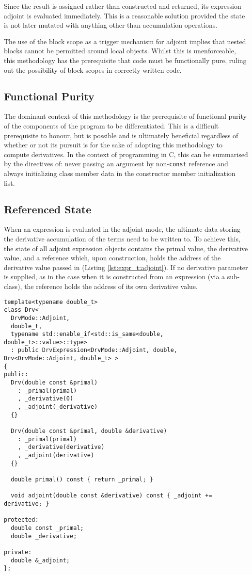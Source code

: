 \documentclass[a4paper,10pt]{article}
\def\CC{{C\nolinebreak[4]\hspace{-.05em}\raisebox{.4ex}{\tiny\bf ++}}}
\begin{document}
Since the result is assigned rather than constructed and returned, its expression adjoint is evaluated immediately. This is a reasonable solution provided the state is not later mutated with anything other than accumulation operations.

The use of the block scope as a trigger mechanism for adjoint implies that nested blocks cannot be permitted around local objects. Whilst this is unenforceable, this methodology has the prerequisite that code must be functionally pure, ruling out the possibility of block scopes in correctly written code.

\subsection{Functional Purity}
The dominant context of this methodology is the prerequisite of functional purity of the components of the program to be differentiated. This is a difficult prerequisite to honour, but is possible and is ultimately beneficial regardless of whether or not its pursuit is for the sake of adopting this methodology to compute derivatives. In the context of programming in {\CC}, this can be summarised by the directives of: never passing an argument by non-\texttt{const} reference and always initializing class member data in the constructor member initialization list.

\subsection{Referenced State}
When an expression is evaluated in the adjoint mode, the ultimate data storing the derivative accumulation of the terms need to be written to. To achieve this, the state of all adjoint expression objects contains the primal value, the derivative value, and a reference which, upon construction, holds the address of the derivative value passed in (Listing \ref{lst:expr_t:adjoint}). If no derivative parameter is supplied, as in the case when it is constructed from an expression (via a sub-class), the reference holds the address of its own derivative value.

\begin{lstlisting}[caption={The adjoint type for a \texttt{double}}, label=lst:expr_t:adjoint]
template<typename double_t>
class Drv<
  DrvMode::Adjoint,
  double_t,
  typename std::enable_if<std::is_same<double, double_t>::value>::type>
  : public DrvExpression<DrvMode::Adjoint, double, Drv<DrvMode::Adjoint, double_t> >
{
public:
  Drv(double const &primal)
    : _primal(primal)
    , _derivative(0)
    , _adjoint(_derivative)
  {}

  Drv(double const &primal, double &derivative)
    : _primal(primal)
    , _derivative(derivative)
    , _adjoint(derivative)
  {}

  double primal() const { return _primal; }

  void adjoint(double const &derivative) const { _adjoint += derivative; }

protected:
  double const _primal;
  double _derivative;

private:
  double &_adjoint;
};
\end{lstlisting}
\end{document}
